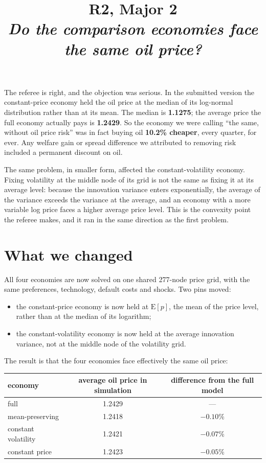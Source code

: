 \documentclass[11pt]{article}
\title{\textbf{R2, Major 2}\\[0.3em]
       \large\normalfont\itshape Do the comparison economies face the same oil price?}
\author{}
\date{}
\begin{document}
\maketitle
\vspace{-3em}


The referee is right, and the objection was serious. In the submitted version
the constant-price economy held the oil price at the median of its log-normal
distribution rather than at its mean. The median is \textbf{1.1275}; the average
price the full economy actually pays is \textbf{1.2429}. So the economy we were
calling ``the same, without oil price risk'' was in fact buying oil
\textbf{10.2\% cheaper}, every quarter, for ever. Any welfare gain or spread
difference we attributed to removing risk included a permanent discount on oil.

The same problem, in smaller form, affected the constant-volatility economy.
Fixing volatility at the middle node of its grid is not the same as fixing it at
its average level: because the innovation variance enters exponentially, the
average of the variance exceeds the variance at the average, and an economy with
a more variable log price faces a higher average price level. This is the
convexity point the referee makes, and it ran in the same direction as the first
problem.

\section*{What we changed}

All four economies are now solved on one shared 277-node price grid, with the
same preferences, technology, default costs and shocks. Two pins moved:

\begin{itemize}
\item the constant-price economy is now held at $\mathrm{E}[p]$, the mean of the
      price level, rather than at the median of its logarithm;
\item the constant-volatility economy is now held at the average innovation
      variance, not at the middle node of the volatility grid.
\end{itemize}

The result is that the four economies face effectively the same oil price:

\begin{table}[h]
\centering
\small
\begin{tabular}{lcc}
\toprule
economy & average oil price in simulation & difference from the full model \\
\midrule
full                 & 1.2429 & --- \\
mean-preserving      & 1.2418 & $-0.10\%$ \\
constant volatility  & 1.2421 & $-0.07\%$ \\
constant price       & 1.2423 & $-0.05\%$ \\
\bottomrule
\end{tabular}
\end{table}
\end{document}
